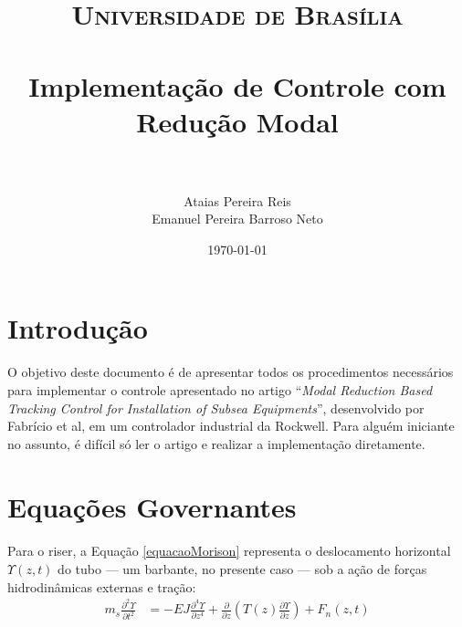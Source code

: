 \documentclass[a4paper,11pt]{scrartcl} %
\title{	
\normalfont \normalsize 
\textsc{Universidade de Brasília} \\ [25pt] %
\horrule{0.5pt} \\[0.4cm] %
\huge Implementação de Controle com Redução Modal \\ %
\horrule{2pt} \\[0.5cm] %
}
\author{Ataias Pereira Reis \\ Emanuel Pereira Barroso Neto} %
\date{\normalsize\today} %
\numberwithin{equation}{section} %
\numberwithin{figure}{section} %
\numberwithin{table}{section} %
\begin{document}
\maketitle %


\section{Introdução}
\paragraph{} O objetivo deste documento é de apresentar todos os procedimentos necessários para implementar o controle apresentado no artigo ``\textit{Modal Reduction Based Tracking Control for Installation of Subsea Equipments}'', desenvolvido por Fabrício et al, em um controlador industrial da Rockwell. Para alguém iniciante no assunto, é difícil só ler o artigo e realizar a implementação diretamente.

\section{Equações Governantes}
\paragraph{} Para o riser, a Equação \ref{equacaoMorison} representa o deslocamento horizontal $\Upsilon(z,t)$ do tubo --- um barbante, no presente caso --- sob a ação de forças hidrodinâmicas externas e tração: \begin{align}
	m_s \frac{\partial^2 \Upsilon}{\partial t^2} &= -EJ \frac{\partial^4 \Upsilon}{\partial z^4} + 	\frac{\partial}{\partial z}\left(T(z)\frac{\partial \Upsilon}{\partial z}\right)+F_n(z,t) \label{equacaoMorison}
\end{align}
\end{document}
